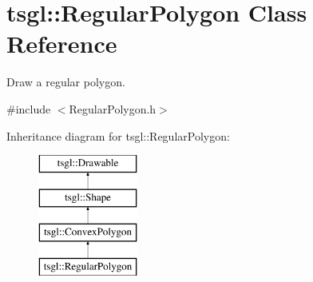 \hypertarget{classtsgl_1_1_regular_polygon}{}\section{tsgl\+:\+:Regular\+Polygon Class Reference}
\label{classtsgl_1_1_regular_polygon}


Draw a regular polygon.  




{\ttfamily \#include $<$Regular\+Polygon.\+h$>$}

Inheritance diagram for tsgl\+:\+:Regular\+Polygon\+:\begin{figure}[H]
\begin{center}
\leavevmode
\includegraphics[height=4.000000cm]{classtsgl_1_1_regular_polygon}
\end{center}
\end{figure}
